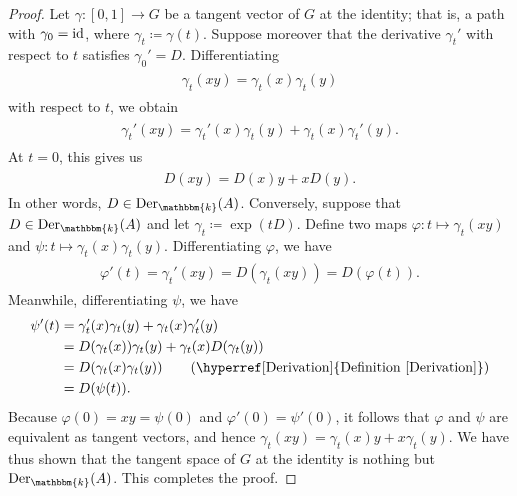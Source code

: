 \noindent\begin{proof} Let $\gamma : [0, 1] \to G$ be a tangent vector of $G$ at the identity; that is, a path with $\gamma_0 = \textup{id}$, where $\gamma_t \coloneqq \gamma(t)$. Suppose moreover that the derivative $\gamma_t'$ with respect to $t$ satisfies $\gamma_0' = D$. Differentiating
\begin{align*}
\begin{split}
\gamma_t(xy) = \gamma_t(x)\gamma_t(y)
\end{split}
\end{align*}
with respect to $t$, we obtain
\begin{align*}
\begin{split}
\gamma_t'(xy) = \gamma_t'(x)\gamma_t(y) + \gamma_t(x)\gamma_t'(y).
\end{split}
\end{align*}
At $t = 0$, this gives us
\begin{align*}
\begin{split}
D(xy) = D(x)y + xD(y).
\end{split}
\end{align*}
In other words, $D \in \textup{Der}_\mathbbm{k}(A)$. Conversely, suppose that $D \in \textup{Der}_\mathbbm{k}(A)$ and let $\gamma_t \coloneqq \exp(tD)$. Define two maps $\varphi : t \mapsto \gamma_t(xy)$ and $\psi : t \mapsto \gamma_t(x)\gamma_t(y)$. Differentiating $\varphi$, we have
\begin{align*}
\begin{split}
\varphi'(t) = \gamma_t'(xy) = D(\gamma_t(xy)) = D(\varphi(t)).
\end{split}
\end{align*}
Meanwhile, differentiating $\psi$, we have
\begin{align*}
\psi'(t) &= \gamma_t'(x)\gamma_t(y) + \gamma_t(x)\gamma_t'(y)\\
&= D(\gamma_t(x))\gamma_t(y) + \gamma_t(x)D(\gamma_t(y))\\
&= D(\gamma_t(x)\gamma_t(y))\tag*{(\hyperref[Derivation]{Definition \ref*{Derivation}})}\\
&= D(\psi(t)).
\end{align*}
Because $\varphi(0) = xy = \psi(0)$ and $\varphi'(0) = \psi'(0)$, it follows that $\varphi$ and $\psi$ are equivalent as tangent vectors, and hence $\gamma_t(xy) = \gamma_t(x)y + x\gamma_t(y)$. We have thus shown that the tangent space of $G$ at the identity is nothing but $\textup{Der}_\mathbbm{k}(A)$. This completes the proof.
\end{proof}\newpage

